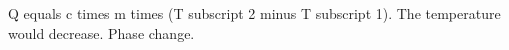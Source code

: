 Q equals c times m times (T subscript 2 minus T subscript 1).  
The temperature would decrease.  
Phase change.